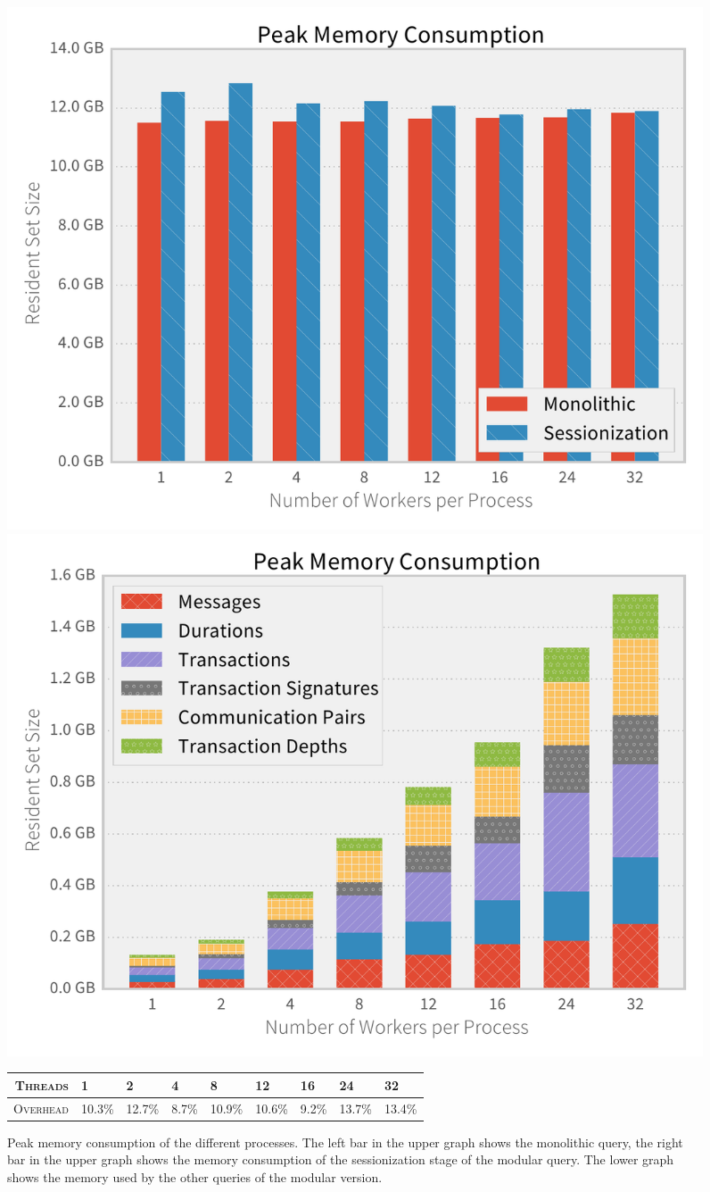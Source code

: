 \begin{figure}[p]
  \centering
    \includegraphics[width=1\textwidth]{figures/evaluation/rsssess}
    \includegraphics[width=1\textwidth]{figures/evaluation/rss}

    {\footnotesize
    \vspace{1em}
    \begin{tabularx}{\textwidth}{ rXXXXXXXX }
      \hline 
      \textsc{Threads} & 1 & 2 & 4 & 8 & 12 & 16 & 24 & 32 \\
      \hline 
      \textsc{Overhead} & 10.3\%&12.7\%&8.7\%&10.9\%&10.6\%&9.2\%&13.7\%&13.4\% \\ %
      \hline
    \end{tabularx}
    }
    \caption[Peak memory consumption]{Peak memory consumption of the different
    processes. The left bar in the upper graph shows the monolithic query, the
    right bar in the upper graph shows the memory consumption of the sessionization
    stage of the modular query. The lower graph shows the memory used by the
    other queries of the modular version.}
    \label{fig:rss}
\end{figure}

